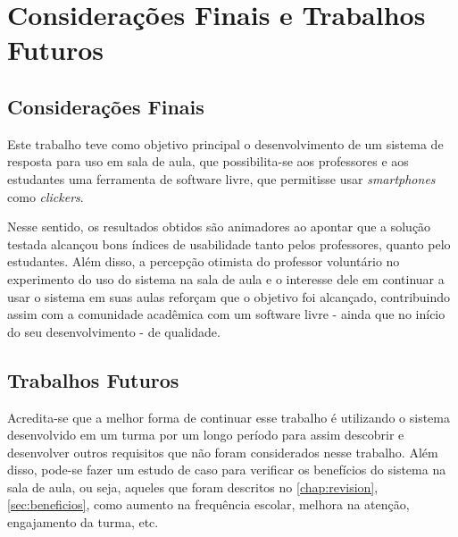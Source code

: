 \chapter{Considerações Finais e Trabalhos Futuros}\label{chap:final_thoughts}

\section{Considerações Finais}

Este trabalho teve como objetivo principal o desenvolvimento de um sistema de resposta para uso em sala de aula,
que possibilita-se aos professores e aos estudantes uma ferramenta de software livre,
que permitisse usar {\textit{smartphones}} como \textit{clickers}.

Nesse sentido, os resultados obtidos são animadores ao apontar que a solução testada alcançou bons índices
de usabilidade tanto pelos professores, quanto pelo estudantes. Além disso, a percepção otimista
do professor voluntário no experimento do uso do sistema na sala de aula e o interesse dele
em continuar a usar o sistema em suas aulas reforçam que o objetivo foi alcançado, contribuindo assim
com a comunidade acadêmica com um software livre - ainda que no início do seu desenvolvimento - de qualidade.

\section{Trabalhos Futuros}

Acredita-se que a melhor forma de continuar esse trabalho é utilizando o sistema
desenvolvido em um turma por um longo período para assim descobrir e desenvolver outros requisitos que não
foram considerados nesse trabalho. Além disso, pode-se fazer um estudo de caso para verificar os benefícios
do sistema na sala de aula, ou seja, aqueles que foram descritos no \autoref{chap:revision}, \autoref{sec:beneficios},
como aumento na frequência escolar, melhora na atenção, engajamento da turma, etc.
